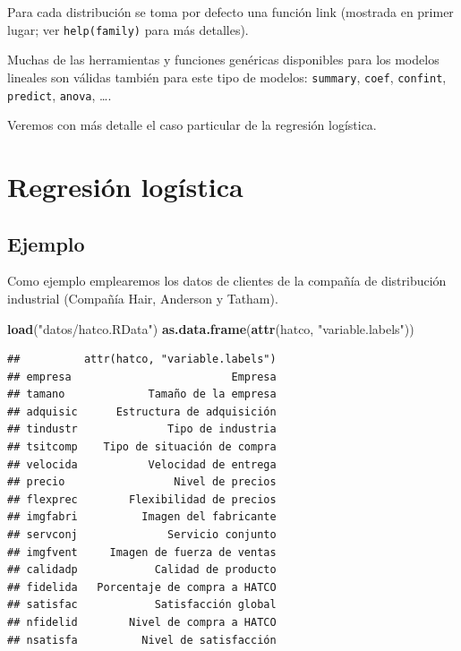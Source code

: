 \documentclass[]{book}
\newenvironment{Shaded}{\begin{snugshade}}{\end{snugshade}}
\newcommand{\KeywordTok}[1]{\textcolor[rgb]{0.13,0.29,0.53}{\textbf{#1}}}
\newcommand{\NormalTok}[1]{#1}
\newcommand{\StringTok}[1]{\textcolor[rgb]{0.31,0.60,0.02}{#1}}
\begin{document}
Para cada distribución se toma por defecto una función link (mostrada en primer lugar; ver \texttt{help(family)} para más detalles).

Muchas de las herramientas y funciones genéricas disponibles para los modelos lineales son válidas
también para este tipo de modelos: \texttt{summary}, \texttt{coef}, \texttt{confint}, \texttt{predict}, \texttt{anova}, \ldots{}.

Veremos con más detalle el caso particular de la regresión logística.

\hypertarget{regresion-logistica}{%
\section{Regresión logística}\label{regresion-logistica}}

\hypertarget{ejemplo-2}{%
\subsection{Ejemplo}\label{ejemplo-2}}

Como ejemplo emplearemos los datos de clientes de la compañía de distribución industrial (Compañía Hair, Anderson y Tatham).

\begin{Shaded}
\begin{Highlighting}[]
\KeywordTok{load}\NormalTok{(}\StringTok{"datos/hatco.RData"}\NormalTok{)}
\KeywordTok{as.data.frame}\NormalTok{(}\KeywordTok{attr}\NormalTok{(hatco, }\StringTok{"variable.labels"}\NormalTok{))}
\end{Highlighting}
\end{Shaded}

\begin{verbatim}
##          attr(hatco, "variable.labels")
## empresa                         Empresa
## tamano             Tamaño de la empresa
## adquisic      Estructura de adquisición
## tindustr              Tipo de industria
## tsitcomp    Tipo de situación de compra
## velocida           Velocidad de entrega
## precio                 Nivel de precios
## flexprec        Flexibilidad de precios
## imgfabri          Imagen del fabricante
## servconj              Servicio conjunto
## imgfvent     Imagen de fuerza de ventas
## calidadp            Calidad de producto
## fidelida   Porcentaje de compra a HATCO
## satisfac            Satisfacción global
## nfidelid        Nivel de compra a HATCO
## nsatisfa          Nivel de satisfacción
\end{verbatim}
\end{document}
